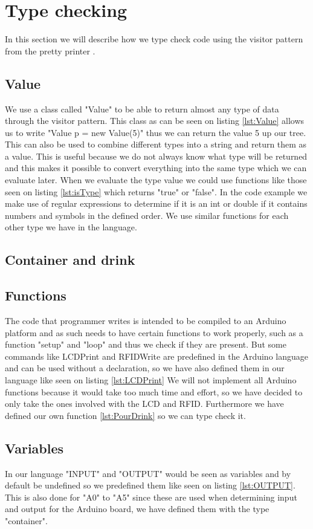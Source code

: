 \section{Type checking}
In this section we will describe how we type check code using the visitor pattern from the pretty printer .

\subsection*{Value}
We use a class called "Value" to be able to return almost any type of data through the visitor pattern.
This class as can be seen on listing \ref{lst:Value} allows us to write "Value p = new Value(5)" thus we can return the value 5 up our tree. This can also be used to combine different types into a string and return them as a value. This is useful because we do not always know what type will be returned and this makes it possible to convert everything into the same type which we can evaluate later.
When we evaluate the type value we could use functions like those seen on listing \ref{lst:isType} which returns "true" or "false". In the code example we make use of regular expressions to determine if it is an int or double if it contains numbers and symbols in the defined order. We use similar functions for each other type we have in the language.

\subsection*{Container and drink}


\subsection*{Functions}
The code that programmer writes is intended to be compiled to an Arduino platform and as such needs to have certain functions to work properly, such as a function "setup" and "loop" and thus we check if they are present. But some commands like LCDPrint and RFIDWrite are predefined in the Arduino language and can be used without a declaration, so we have also defined them in our language like seen on listing \ref{lst:LCDPrint}
We will not implement all Arduino functions because it would take too much time and effort, so we have decided to only take the ones involved with the LCD and RFID. Furthermore we have defined our own function \ref{lst:PourDrink} so we can type check it.

\subsection*{Variables}
In our language "INPUT" and "OUTPUT" would be seen as variables and by default be undefined so we predefined them like seen on listing \ref{lst:OUTPUT}. This is also done for "A0" to "A5" since these are used when determining input and output for the Arduino board, we have defined them with the type "container".
